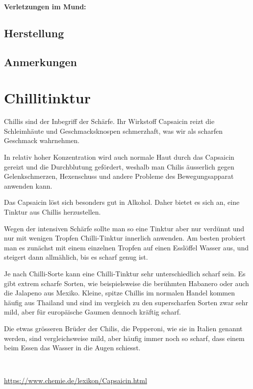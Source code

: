 \textbf{Verletzungen im Mund:} \\


\subsection{Herstellung}

\subsection{Anmerkungen}





\section{Chillitinktur}

Chillis sind der Inbegriff der Schärfe. Ihr Wirkstoff Capsaicin reizt die Schleimhäute und Geschmacksknospen schmerzhaft, was wir als scharfen Geschmack wahrnehmen.

In relativ hoher Konzentration wird auch normale Haut durch das Capsaicin gereizt und die Durchblutung gefördert, weshalb man Chilis äusserlich gegen Gelenkschmerzen, Hexenschuss und andere Probleme des Bewegungsapparat anwenden kann.

Das Capsaicin löst sich besonders gut in Alkohol. Daher bietet es sich an, eine Tinktur aus Chillis herzustellen.

Wegen der intensiven Schärfe sollte man so eine Tinktur aber nur verdünnt und nur mit wenigen Tropfen Chilli-Tinktur innerlich anwenden. Am besten probiert man es zunächst mit einem einzelnen Tropfen auf einen Esslöffel Wasser aus, und steigert dann allmählich, bis es scharf genug ist.

Je nach Chilli-Sorte kann eine Chilli-Tinktur sehr unterschiedlich scharf sein. Es gibt extrem scharfe Sorten, wie beispielsweise die berühmten Habanero oder auch die Jalapeno aus Mexiko. Kleine, spitze Chillis im normalen Handel kommen häufig aus Thailand und sind im vergleich zu den superscharfen Sorten zwar sehr mild, aber für europäische Gaumen dennoch kräftig scharf.

Die etwas grösseren Brüder der Chilis, die Pepperoni, wie sie in Italien genannt werden, sind vergleichsweise mild, aber häufig immer noch so scharf, dass einem beim Essen das Wasser in die Augen schiesst.

\cite{tinkturen}  ~\cite{heilkraeuterlexikon}

\url{https://www.chemie.de/lexikon/Capsaicin.html}

